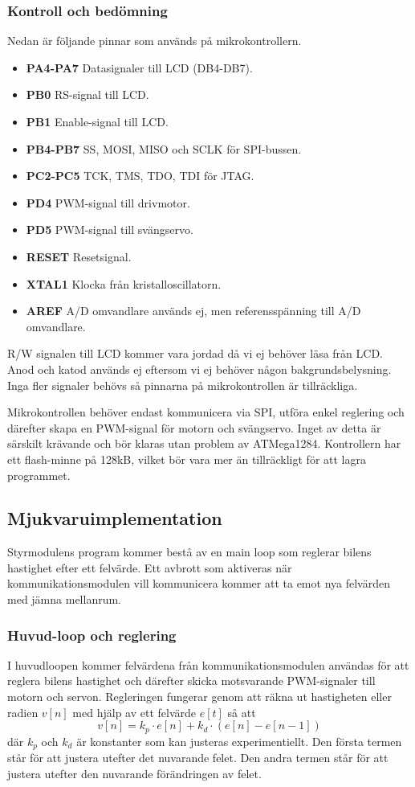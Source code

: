 \documentclass[designspec/spec.tex]{subfiles}
\begin{document}
\subsubsection{Kontroll och bedömning}
Nedan är följande pinnar som används på mikrokontrollern.
\begin{itemize}
   \item \textbf{PA4-PA7} Datasignaler till LCD (DB4-DB7).
   \item \textbf{PB0} RS-signal till LCD.
   \item \textbf{PB1} Enable-signal till LCD.
   \item \textbf{PB4-PB7} SS, MOSI, MISO och SCLK för SPI-bussen.
   \item \textbf{PC2-PC5} TCK, TMS, TDO, TDI för JTAG.
   \item \textbf{PD4} PWM-signal till drivmotor.
   \item \textbf{PD5} PWM-signal till svängservo.
   \item \textbf{RESET} Resetsignal.
   \item \textbf{XTAL1} Klocka från kristalloscillatorn.
   \item \textbf{AREF} A/D omvandlare används ej, men referensspänning till A/D omvandlare.
\end{itemize}
R/W signalen till LCD kommer vara jordad då vi ej behöver läsa från LCD. Anod
och katod används ej eftersom vi ej behöver någon bakgrundsbelysning.  Inga
fler signaler behövs så pinnarna på mikrokontrollen är tillräckliga.

Mikrokontrollen behöver endast kommunicera via SPI, utföra enkel reglering och
därefter skapa en PWM-signal för motorn och svängservo. Inget av detta är
särskilt krävande och bör klaras utan problem av ATMega1284. Kontrollern har
ett flash-minne på 128kB, vilket bör vara mer än tillräckligt för att lagra
programmet.

\subsection{Mjukvaruimplementation} Styrmodulens program kommer bestå av en
main loop som reglerar bilens hastighet efter ett felvärde. Ett avbrott som
aktiveras när kommunikationsmodulen vill kommunicera kommer att ta emot nya
felvärden med jämna mellanrum.

\subsubsection{Huvud-loop och reglering}
I huvudloopen kommer felvärdena från kommunikationsmodulen användas för att
reglera bilens hastighet och därefter skicka motsvarande PWM-signaler till
motorn och servon. Regleringen fungerar genom att räkna ut hastigheten eller
radien $v[n]$ med hjälp av ett felvärde $e[t]$ så att
\begin{equation*}
    v[n] = k_p \cdot e[n] + k_d \cdot (e[n]-e[n-1])
\end{equation*}
där $k_p$ och $k_d$ är konstanter som kan justeras experimentiellt. Den första
termen står för att justera utefter det nuvarande felet. Den andra termen står
för att justera utefter den nuvarande förändringen av felet.
\end{document}
